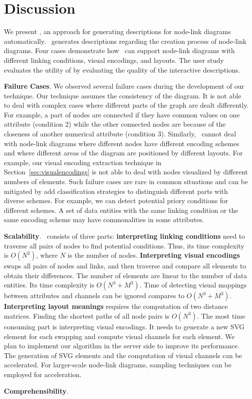 \section{Discussion}
We present \ApproachName, an approach for generating descriptions for node-link diagrams automatically.
\ApproachName~generates descriptions regarding the creation process of node-link diagrams.
Four cases demonstrate how \ApproachName~can support node-link diagrams with different linking conditions, visual encodings, and layouts.
The user study evaluates the utility of \ApproachName by evaluating the quality of the interactive descriptions.


\textbf{Failure Cases}.
We observed several failure cases during the development of our technique.
Our technique assumes the consistency of the diagram.
It is not able to deal with complex cases where different parts of the graph are dealt differently.
For example, a part of nodes are connected if they have common values on one attribute (condition 2) while the other connected nodes are because of the closeness of another numerical attribute (condition 3).
Similarly, \ApproachName~cannot deal with node-link diagrams where different nodes have different encoding schemes and where different areas of the diagram are positioned by different layouts.
For example, our visual encoding extraction technique in Section~\ref{sec:visualencodings} is not able to deal with nodes visualized by different numbers of elements.
Such failure cases are rare in common situations and can be mitigated by add classification strategies to distinguish different parts with diverse schemes.
For example, we can detect potential priory conditions for different schemes.
A set of data entities with the same linking condition or the same encoding scheme may have commonalities in some attributes.

\textbf{Scalability}.
\ApproachName~consists of three parts:
\textbf{interpreting linking conditions} need to traverse all pairs of nodes to find potential conditions.
Thus, its time complexity is $O(N^2)$, where $N$ is the number of nodes.
\textbf{Interpreting visual encodings} swaps all pairs of nodes and links, and then traverse and compare all elements to obtain their differences.
The number of elements are linear to the number of data entities.
Its time complexity is $O(N^3 + M^3)$.
Time of detecting visual mappings between attributes and channels can be ignored compares to $O(N^3 + M^3)$.
\textbf{Interpreting layout meanings} requires the computation of two distance matrices.
Finding the shortest paths of all node pairs is $O(N^3)$.
The most time consuming part is interpreting visual encodings.
It needs to generate a new SVG element for each swapping and compute visual channels for each element.
We plan to implement our algorithm in the server side to improve its performance.
The generation of SVG elements and the computation of visual channels can be accelerated.
For larger-scale node-link diagrams, sampling techniques can be employed for acceleration.

\textbf{Comprehensibility}.
